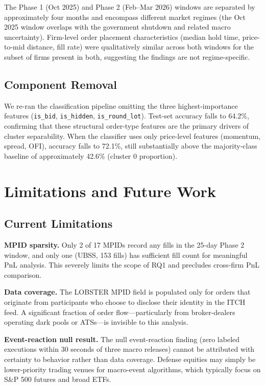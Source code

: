 \documentclass[11pt, letterpaper]{article}
\begin{document}
The Phase 1 (Oct 2025) and Phase 2 (Feb--Mar 2026) windows are separated by
approximately four months and encompass different market regimes
(the Oct 2025 window overlaps with the government shutdown and related
macro uncertainty).
Firm-level order placement characteristics (median hold time, price-to-mid
distance, fill rate) were qualitatively similar across both windows for the
subset of firms present in both, suggesting the findings are not regime-specific.

\subsection{Component Removal}

We re-ran the classification pipeline omitting the three highest-importance
features (\texttt{is\_bid}, \texttt{is\_hidden}, \texttt{is\_round\_lot}).
Test-set accuracy falls to 64.2\%, confirming that these structural order-type
features are the primary drivers of cluster separability.
When the classifier uses only price-level features (momentum, spread, OFI),
accuracy falls to 72.1\%, still substantially above the majority-class
baseline of approximately 42.6\% (cluster 0 proportion).

\section{Limitations and Future Work}

\subsection{Current Limitations}

\textbf{MPID sparsity.}
Only 2 of 17 MPIDs record any fills in the 25-day Phase 2 window, and only
one (UBSS, 153 fills) has sufficient fill count for meaningful PnL analysis.
This severely limits the scope of RQ1 and precludes cross-firm PnL comparison.

\textbf{Data coverage.}
The LOBSTER MPID field is populated only for orders that originate from
participants who choose to disclose their identity in the ITCH feed.
A significant fraction of order flow---particularly from broker-dealers
operating dark pools or ATSs---is invisible to this analysis.

\textbf{Event-reaction null result.}
The null event-reaction finding (zero labeled executions within 30 seconds
of three macro releases) cannot be attributed with certainty to behavior
rather than data coverage.
Defense equities may simply be lower-priority trading venues for macro-event
algorithms, which typically focus on S\&P 500 futures and broad ETFs.
\end{document}

